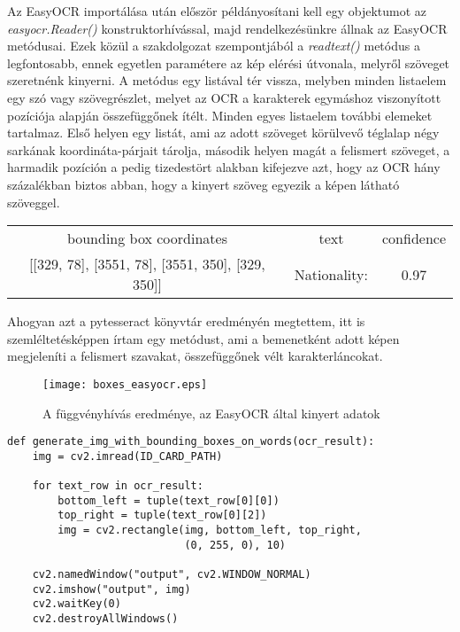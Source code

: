 \documentclass[12pt]{report}
\begin{document}
Az EasyOCR importálása után először példányosítani kell egy objektumot az \newline \emph{easyocr.Reader()} konstruktorhívással, majd rendelkezésünkre állnak az EasyOCR metódusai. Ezek közül a szakdolgozat szempontjából a \emph{readtext()} metódus a legfontosabb, ennek egyetlen paramétere az kép elérési útvonala, melyről szöveget szeretnénk kinyerni.
A metódus egy listával tér vissza, melyben minden listaelem egy szó vagy szövegrészlet, melyet az OCR a karakterek egymáshoz viszonyított pozíciója alapján összefüggőnek ítélt. Minden egyes listaelem további elemeket tartalmaz. Első helyen egy listát, ami az adott szöveget körülvevő téglalap négy sarkának koordináta-párjait tárolja, második helyen magát a felismert szöveget, a harmadik pozíción a pedig tizedestört alakban kifejezve azt, hogy az OCR hány százalékban biztos abban, hogy a kinyert szöveg egyezik a képen látható szöveggel.

\begin{tcolorbox}
    \begin{center}
        \begin{tabular}{ c c c }
         bounding box coordinates & text & confidence \\ 
         {[}{[}329, 78{]}, {[}3551, 78{]}, {[}3551, 350{]}, {[}329, 350{]}{]} & Nationality: & 0.97 \\
        \end{tabular}
    \end{center}
\end{tcolorbox}

\noindent
Ahogyan azt a pytesseract könyvtár eredményén megtettem, itt is szemléltetésképpen írtam egy metódust, ami a bemenetként adott képen megjeleníti a felismert szavakat, összefüggőnek vélt karakterláncokat.

\pagebreak

\begin{figure}[h]
    \centerline{\texttt{[image: boxes\_easyocr.eps]}}
    \caption{A függvényhívás eredménye, az EasyOCR által kinyert adatok}
\end{figure}

\begin{verbatim}
def generate_img_with_bounding_boxes_on_words(ocr_result):
    img = cv2.imread(ID_CARD_PATH)

    for text_row in ocr_result:
        bottom_left = tuple(text_row[0][0])
        top_right = tuple(text_row[0][2])
        img = cv2.rectangle(img, bottom_left, top_right, 
                            (0, 255, 0), 10)

    cv2.namedWindow("output", cv2.WINDOW_NORMAL)
    cv2.imshow("output", img)
    cv2.waitKey(0)
    cv2.destroyAllWindows()
\end{verbatim}
\end{document}
